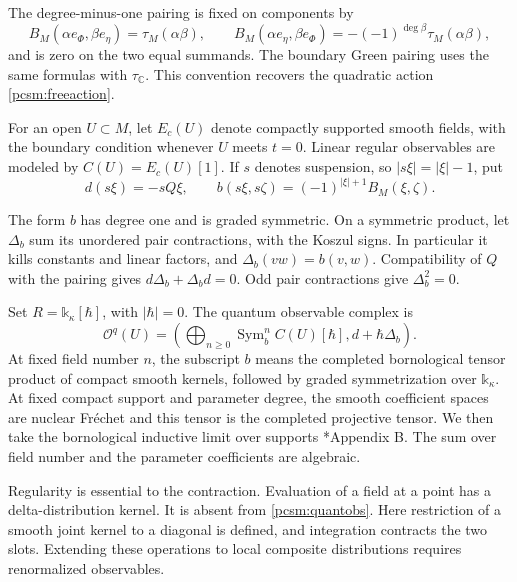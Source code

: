 The degree-minus-one pairing is fixed on components by
\[
 B_M(\alpha e_\Phi,\beta e_\eta)=\tau_M(\alpha\beta),\qquad
 B_M(\alpha e_\eta,\beta e_\Phi)
       =-(-1)^{\deg\beta}\tau_M(\alpha\beta),
\]
and is zero on the two equal summands.
The boundary Green pairing uses the same formulas with
\(\tau_{\mathbb C}\).
This convention recovers the quadratic action
\eqref{pcsm:freeaction}.

For\label{pcsm:def:linear-regular-observables} an open \(U\subset M\), let \(E_c(U)\) denote compactly
supported smooth fields, with the boundary condition whenever
\(U\) meets \(t=0\).
Linear regular observables are modeled by \(C(U)=E_c(U)[1]\).
If \(s\) denotes suspension, so \(|s\xi|=|\xi|-1\), put
\[
 d(s\xi)=-sQ\xi,\qquad
 b(s\xi,s\zeta)=(-1)^{|\xi|+1}B_M(\xi,\zeta).
\]

The form \(b\) has degree one and is graded symmetric.
On a symmetric product, let \(\Delta_b\) sum its unordered pair
contractions, with the Koszul signs. In particular it kills constants
and linear factors, and \(\Delta_b(vw)=b(v,w)\).
Compatibility of \(Q\) with the pairing gives
\(d\Delta_b+\Delta_bd=0\). Odd pair contractions give
\(\Delta_b^2=0\).

Set\label{pcsm:def:quantum-coefficient-ring} \(R=\mathbb k_\kappa[\hbar]\), with \(|\hbar|=0\).
The quantum observable complex is
\begin{equation}\label{pcsm:quantobs}
 \mathcal O^q(U)=
 \left(\bigoplus_{n\geq0}\operatorname{Sym}_b^n C(U)[\hbar],
                         d+\hbar\Delta_b\right).
\end{equation}
At fixed field number \(n\), the subscript \(b\) means the
completed bornological tensor product of compact smooth kernels,
followed by graded symmetrization over \(\mathbb k_\kappa\).
At fixed compact support and parameter degree, the smooth coefficient
spaces are nuclear Fr\'echet and this tensor is the completed
projective tensor.
We then take the bornological inductive limit over supports
\cite{pcsm:GRW}*{Appendix B}.
The sum over field number and the parameter coefficients are algebraic.

Regularity is essential to the contraction.
Evaluation of a field at a point has a delta-distribution kernel.
It is absent from \eqref{pcsm:quantobs}.
Here restriction of a smooth joint kernel to a diagonal is defined,
and integration contracts the two slots.
Extending these operations to local composite distributions requires
renormalized observables.

